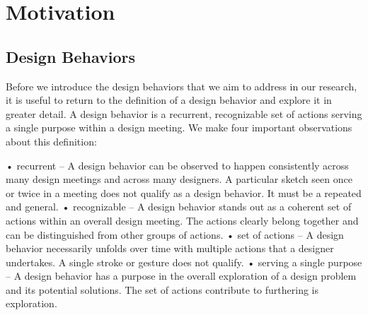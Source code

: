 \chapter{Motivation}

\section{Design Behaviors}

Before we introduce the design behaviors that we aim to address in our research, it is useful to return to the definition of a design behavior and explore it in greater detail. A design behavior is a recurrent, recognizable set of actions serving a single purpose within a design meeting. We make four important observations about this definition:

•	recurrent – A design behavior can be observed to happen consistently across many design meetings and across many designers. A particular sketch seen once or twice in a meeting does not qualify as a design behavior. It must be a repeated and general.
•	recognizable – A design behavior stands out as a coherent set of actions within an overall design meeting. The actions clearly belong together and can be distinguished from other groups of actions.
•	set of actions – A design behavior necessarily unfolds over time with multiple actions that a designer undertakes. A single stroke or gesture does not qualify.   
•	serving a single purpose – A design behavior has a purpose in the overall exploration of a design problem and its potential solutions. The set of actions contribute to furthering is exploration.

